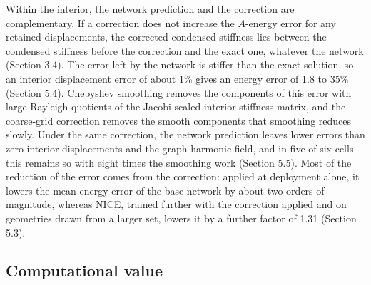 \documentclass[preprint,12pt,authoryear]{elsarticle}
\begin{document}
Within the interior, the network prediction and the correction are complementary. If a correction does not increase the \(A\)-energy error for any retained displacements, the corrected condensed stiffness lies between the condensed stiffness before the correction and the exact one, whatever the network (Section 3.4). The error left by the network is stiffer than the exact solution, so an interior displacement error of about 1\% gives an energy error of 1.8 to 35\% (Section 5.4). Chebyshev smoothing removes the components of this error with large Rayleigh quotients of the Jacobi-scaled interior stiffness matrix, and the coarse-grid correction removes the smooth components that smoothing reduces slowly. Under the same correction, the network prediction leaves lower errors than zero interior displacements and the graph-harmonic field, and in five of six cells this remains so with eight times the smoothing work (Section 5.5). Most of the reduction of the error comes from the correction: applied at deployment alone, it lowers the mean energy error of the base network by about two orders of magnitude, whereas NICE, trained further with the correction applied and on geometries drawn from a larger set, lowers it by a further factor of 1.31 (Section 5.3).

\subsection{Computational value}
\end{document}
